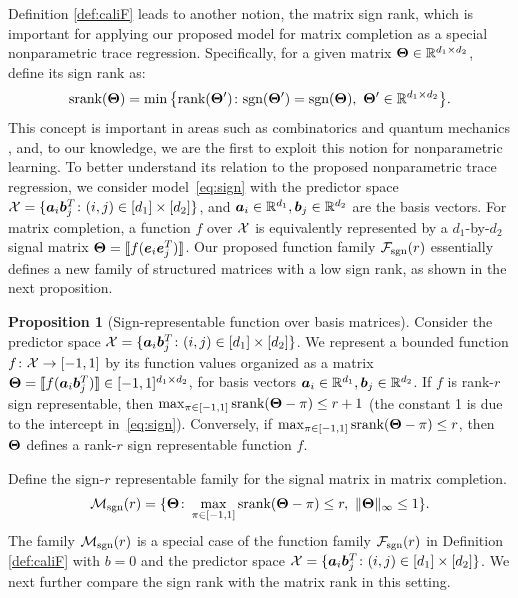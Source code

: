 \documentclass[11pt]{article}
\theoremstyle{plain}
\theoremstyle{definition}
\newtheorem{prop}{Proposition}
\def\caliF{\tF_{\textup{sgn}}}
\def\caliM{\tM_{\textup{sgn}}}
\def\sign{\textup{sgn}}
\def\srank{\textup{srank}}
\def\rank{\textup{rank}}
\def\caliF{\tF_{\textup{sgn}}}
\def\caliM{\tM_{\textup{sgn}}}
\begin{document}
Definition \ref{def:caliF} leads to another notion, the matrix sign rank, which is important for applying our proposed model for matrix completion as a special nonparametric trace regression. Specifically, for a given matrix $\bm{\Theta}\in\mathbb{R}^{d_1\times d_2}$, define its sign rank as: 
\begin{equation*}
\srank(\mTheta)=\min\big\{ \rank(\mTheta')\colon \sign(\mTheta')=\sign(\mTheta),\  \mTheta'\in\mathbb{R}^{d_1\times d_2} \big\}.
\end{equation*}
This concept is important in areas such as combinatorics \citep{cohn2013fast} and quantum mechanics \citep{de2003nondeterministic}, and, to our knowledge, we are the first to exploit this notion for nonparametric learning. To better understand its relation to the proposed nonparametric trace regression, we consider model~\eqref{eq:sign} with the predictor space $\mathcal{X} = \{\bm{a}_i\bm{b}_j^T\colon (i,j)\in[d_1]\times[d_2]\}$, and $\bm{a}_i\in\mathbb{R}^{d_1}, \bm{b}_j\in\mathbb{R}^{d_2}$ are the basis vectors. For matrix completion, a function $f$ over $\mathcal{X}$ is equivalently represented by a $d_1$-by-$d_2$ signal matrix $\bm{\Theta}=\llbracket f(\bm{e}_i\bm{e}_j^T) \rrbracket$. Our proposed function family $\caliF(r)$ essentially defines a new family of structured matrices with a low sign rank, as shown in the next proposition. 

\begin{prop}[Sign-representable function over basis matrices]\label{prop:signbasis} Consider the predictor space $\mathcal{X}=\{\bm{a}_i\bm{b}_j^T \colon (i,j)\in[d_1]\times[d_2]\}$. We represent a bounded function $f\colon \mathcal{X}\to [-1,1]$ by its function values organized as a matrix $\bm{\Theta}=\llbracket f(\bm{a}_i\bm{b}_j^T) \rrbracket \in [-1,1]^{d_1\times d_2}$, for basis vectors $\bm{a}_i\in\mathbb{R}^{d_1}, \bm{b}_j\in\mathbb{R}^{d_2}$. If $f$ is rank-$r$ sign representable, then $\max_{\pi\in[-1,1]}\srank(\mTheta-\pi)\leq r+1$ (the constant 1 is due to the intercept in~\eqref{eq:sign}). Conversely, if $\max_{\pi\in[-1,1]}\srank(\mTheta-\pi)\leq r$, then $\bm{\Theta}$ defines a rank-$r$ sign representable function $f$. 
\end{prop}

Define the sign-$r$ representable family for the signal matrix in matrix completion.  
\begin{align*}
\caliM(r)=\{\mTheta\colon \max_{\pi\in[-1,1]}\srank(\mTheta-\pi)\leq r, \ \mnormSize{}{\mTheta}\leq 1\}.
\end{align*}
The family $\caliM(r)$ is a special case of the function family $\caliF(r)$ in Definition \ref{def:caliF} with $b=0$ and the predictor space $\mathcal{X}=\{\bm{a}_i\bm{b}_j^T\colon (i,j)\in[d_1]\times[d_2]\}$. We next further compare the sign rank with the matrix rank in this setting. 
\end{document}
